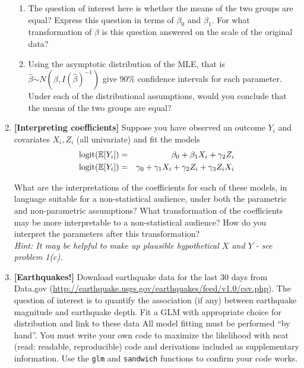\documentclass[12pt]{article}
\newcommand{\e}{\mathbb{E}}
\begin{document}
\begin{enumerate}
\begin{enumerate}
\item The question of interest here is whether the means of the two groups are equal? Express this question in terms of $\beta_0$ and $\beta_1$. For what transformation of $\beta$ is this question answered on the scale of the original data? 
\item Using the asymptotic distribution of the MLE, that is $\hat{\beta} \dot{\sim} N(\beta,I(\hat{\beta})^{-1})$ give 90\% confidence intervals for each parameter. Under each of the distributional assumptions, would you conclude that the means of the two groups are equal? 
\end{enumerate} 

\item \textbf{[Interpreting coefficients]}
Suppose you have observed an outcome $Y_i$ and covariates $X_i, Z_i$ (all univariate) and fit the models
\begin{eqnarray}
{\rm logit}(\e[Y_i]) &=& \beta_0 + \beta_1 X_i + \gamma_2 Z_i\\
{\rm logit}(\e[Y_i]) &=& \gamma_0 + \gamma_1 X_i + \gamma_2 Z_i  + \gamma_3 Z_iX_i
\end{eqnarray}

What are the interpretations of the coefficients for each of these models, in language suitable for a non-statistical audience, under both the parametric and non-parametric assumptions? What transformation of the coefficients may be more interpretable to a non-statistical audience? How do you interpret the parameters after this transformation?\\
{\it Hint: It may be helpful to make up plausible hypothetical $X$ and $Y$ - see problem 1(c).}


\item \textbf{[Earthquakes!]}
Download earthquake data for the last 30 days from Data.gov (\url{http://earthquake.usgs.gov/earthquakes/feed/v1.0/csv.php}). The question of interest is to quantify the association (if any) between earthquake magnitude and earthquake depth. Fit a GLM with appropriate  choice for distribution and link to these data  All model fitting must be performed ``by hand''. You must write your own code to maximize the likelihood with neat (read: readable, reproducible) code and derivations included as supplementary information. Use the {\tt glm} and {\tt sandwich} functions to confirm your code works. 
\end{enumerate}
\end{document}
